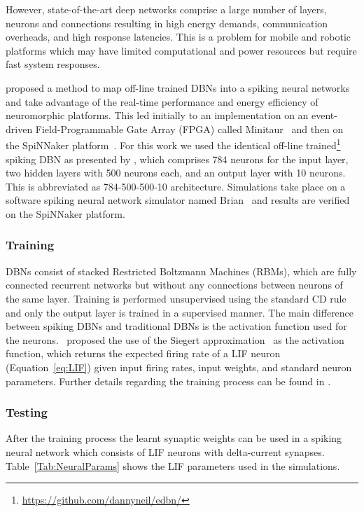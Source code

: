 \documentclass{frontiersENG} %
\begin{document}
However, state-of-the-art deep networks comprise a large number of layers, neurons and connections resulting in high energy demands, communication overheads, and high response latencies. This is a problem for mobile and robotic platforms which may have limited computational and power resources but require fast system responses. 


\citet{o2013real} proposed a method to map off-line trained DBNs into a spiking neural networks and take advantage of the real-time performance and energy efficiency of neuromorphic platforms. This led initially to an implementation on an event-driven Field-Programmable Gate Array (FPGA) called Minitaur~\citep{neil2014minitaur} and then on the SpiNNaker platform~\citep{Stromatias2015scalable}. For this work we used the identical off-line trained\footnote{\url{https://github.com/dannyneil/edbn/}} spiking DBN as presented by \citet{o2013real}, which comprises 784 neurons for the input layer, two hidden layers with 500 neurons each, and an output layer with 10 neurons. This is abbreviated as 784-500-500-10 architecture. Simulations take place on a software spiking neural network simulator named Brian~\citep{goodman2008brian} and results are verified on the SpiNNaker platform.

\subsubsection{Training}

DBNs consist of stacked Restricted Boltzmann Machines (RBMs), which are fully connected recurrent networks but without any connections between neurons of the same layer. Training is performed unsupervised using the standard CD rule~\citep{hinton2006fast} and only the output layer is trained in a supervised manner. The main difference between spiking DBNs and traditional DBNs is the activation function used for the neurons.~\cite{o2013real} proposed the use of the Siegert approximation~\citep{Jug_etal_2012} as the activation function, which returns the expected firing rate of a LIF neuron (Equation~\ref{eq:LIF}) given input firing rates, input weights, and standard neuron parameters. Further details regarding the training process can be found in \citet{o2013real}.

\subsubsection{Testing}
After the training process the learnt synaptic weights can be used in a spiking neural network which consists of LIF neurons with delta-current synapses. Table~\ref{Tab:NeuralParams} shows the LIF parameters used in the simulations.
\end{document}
